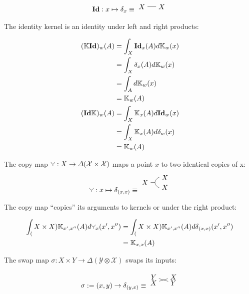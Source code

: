 \begin{align}
\textbf{Id} : x\mapsto \delta_x \equiv \begin{tikzpicture}\path (0,0) node (X) {$X$} + (1,0) node (X1) {$X$}; \draw (X)--(X1); \end{tikzpicture}\label{eq:identity}
\end{align}

The identity kernel is an identity under left and right products:

\begin{align}
	(\mathbb{K}\textbf{Id})_w(A) &= \int_X \textbf{Id}_x(A) d\mathbb{K}_w (x) \\
							 	 &= \int_X \delta_x(A) d\mathbb{K}_w(x)\\
							 	 &= \int_A d\mathbb{K}_w(x)\\
							 	 &= \mathbb{K}_w(A)\\
	(\textbf{Id}\mathbb{K})_w(A) &= \int_X \mathbb{K}_x (A) d\textbf{Id}_w(x)\\
								 &= \int_X  \mathbb{K}_x(A) d\delta_w(x)\\
								 &= \mathbb{K}_w(A)								  
\end{align}

The copy map $\splitter{0.1}:X\to \Delta(\mathcal{X}\times \mathcal{X})$ maps a point $x$ to two identical copies of x:
\begin{align}
 \splitter{0.1}: x\mapsto \delta_{(x,x)} \equiv \begin{tikzpicture}
 \path (0,0) node (X) {$X$} ++ (0.5,0) coordinate (copy0) ++ (0.5,0.25) node (X1) {$X$} ++(0,-0.5) node (X2) {$X$};\draw (X)--(copy0) to [bend left] (X1) (copy0) to [bend right] (X2);
 \end{tikzpicture}\label{eq:copy}
 \end{align} 

The copy map ``copies'' its arguments to kernels or under the right product:

\begin{align}
	\int_(X\times X) \kernel{K}_{x',x''}(A) d\splitter{0.1}_x (x',x'') &= \int_(X\times X) \kernel{K}_{x',x''}(A) d\delta_{(x,x)}(x',x'')\\
															&= \kernel{K}_{x,x}(A)
\end{align}

The swap map $\sigma:X\times Y\to \Delta(\mathcal{Y}\otimes\mathcal{X})$ swaps its inputs:

\begin{align}
\sigma := (x,y)\to \delta_{(y,x)} \equiv \begin{tikzpicture}
\path (0,0) node (X) {$X$}
+(1,0.3) node (X1) {$X$}
(0,0.3) node (Y) {$Y$}
+(1,-0.3) node (Y1) {$Y$};
\draw (X)--(X1) (Y) -- (Y1);
\end{tikzpicture}\label{eq:swap}
\end{align}

